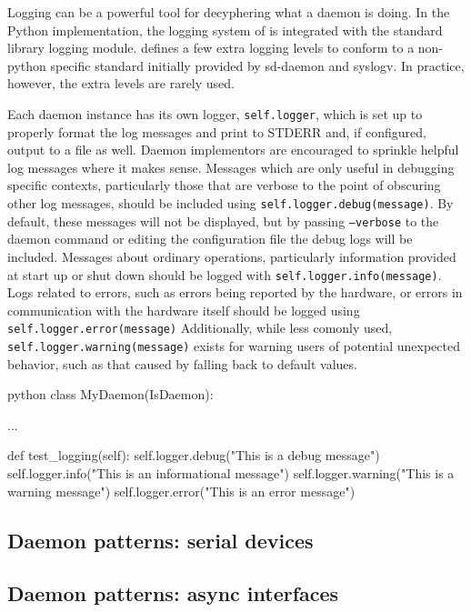 Logging can be a powerful tool for decyphering what a daemon is doing.
In the Python implementation, the logging system of \yaq{} is integrated with the standard library logging module\cite{}.
\yaq{} defines a few extra logging levels to conform to a non-python specific standard initially provided by sd-daemon\cite{} and syslogv\cite{}.
In practice, however, the extra levels are rarely used.

Each daemon instance has its own logger, \texttt{self.logger}, which is set up to properly format the log messages and print to STDERR and, if configured, output to a file as well.
Daemon implementors are encouraged to sprinkle helpful log messages where it makes sense.
Messages which are only useful in debugging specific contexts, particularly those that are verbose to the point of obscuring other log messages, should be included using \texttt{self.logger.debug(message)}.
By default, these messages will not be displayed, but by passing \texttt{--verbose} to the daemon command or editing the configuration file the debug logs will be included.
Messages about ordinary operations, particularly information provided at start up or shut down should be logged with \texttt{self.logger.info(message)}.
Logs related to errors, such as errors being reported by the hardware, or errors in communication with the hardware itself should be logged using \texttt{self.logger.error(message)}
Additionally, while less comonly used, \texttt{self.logger.warning(message)} exists for warning users of potential unexpected behavior, such as that caused by falling back to default values.

\begin{codefragment}{python}
class MyDaemon(IsDaemon):

    ...

    def test_logging(self):
        self.logger.debug("This is a debug message")
        self.logger.info("This is an informational message")
        self.logger.warning("This is a warning message")
        self.logger.error("This is an error message")
\end{codefragment}


\subsection{Daemon patterns: serial devices}

\subsection{Daemon patterns: async interfaces}

\clearpage
